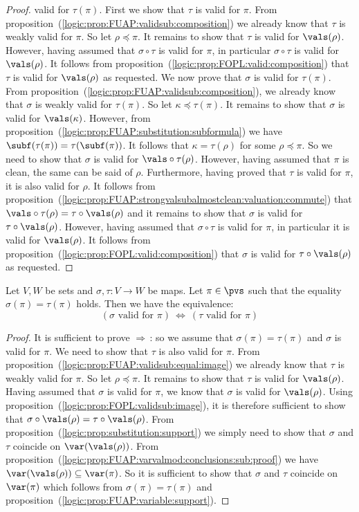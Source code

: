 \begin{proof}
valid for $\tau(\pi)$. First we show that $\tau$ is valid for $\pi$.
From proposition~(\ref{logic:prop:FUAP:validsub:composition}) we
already know that $\tau$ is weakly valid for $\pi$. So let
$\rho\preceq\pi$. It remains to show that $\tau$ is valid for
$\vals(\rho)$. However, having assumed that $\sigma\circ\tau$ is
valid for $\pi$, in particular $\sigma\circ\tau$ is valid for
$\vals(\rho)$. It follows from
proposition~(\ref{logic:prop:FOPL:valid:composition}) that $\tau$ is
valid for $\vals(\rho)$ as requested. We now prove that $\sigma$ is
valid for $\tau(\pi)$. From
proposition~(\ref{logic:prop:FUAP:validsub:composition}), we already
know that $\sigma$ is weakly valid for $\tau(\pi)$. So let
$\kappa\preceq\tau(\pi)$. It remains to show that $\sigma$ is valid
for $\vals(\kappa)$. However, from
proposition~(\ref{logic:prop:FUAP:substitution:subformula}) we have
$\subf(\tau(\pi))=\tau(\subf(\pi))$. It follows that
$\kappa=\tau(\rho)$ for some $\rho\preceq\pi$. So we need to show
that $\sigma$ is valid for $\vals\circ\tau(\rho)$. However, having
assumed that $\pi$ is clean, the same can be said of $\rho$.
Furthermore, having proved that $\tau$ is valid for $\pi$, it is
also valid for $\rho$. It follows from
proposition~(\ref{logic:prop:FUAP:strongvalsubalmostclean:valuation:commute})
that $\vals\circ\tau(\rho)=\tau\circ\vals(\rho)$ and it remains to
show that $\sigma$ is valid for $\tau\circ\vals(\rho)$. However,
having assumed that $\sigma\circ\tau$ is valid for $\pi$, in
particular it is valid for $\vals(\rho)$. It follows from
proposition~(\ref{logic:prop:FOPL:valid:composition}) that $\sigma$
is valid for $\tau\circ\vals(\rho)$ as requested.
\end{proof}

\begin{prop}\label{logic:prop:FUAP:strongvalidsub:equal:image}
Let $V,W$ be sets and $\sigma,\tau:V\to W$ be maps. Let $\pi\in\pvs$
such that the equality $\sigma(\pi)=\tau(\pi)$ holds. Then we have
the equivalence:
    \[
    (\mbox{$\sigma$ valid for $\pi$})\ \Leftrightarrow\
    (\mbox{$\tau$ valid for $\pi$})
    \]
\end{prop}
\begin{proof}
It is sufficient to prove $\Rightarrow$\,: so we assume that
$\sigma(\pi)=\tau(\pi)$ and $\sigma$ is valid for $\pi$. We need to
show that $\tau$ is also valid for $\pi$. From
proposition~(\ref{logic:prop:FUAP:validsub:equal:image}) we already
know that $\tau$ is weakly valid for $\pi$. So let $\rho\preceq\pi$.
It remains to show that $\tau$ is valid for $\vals(\rho)$. Having
assumed that $\sigma$ is valid for $\pi$, we know that $\sigma$ is
valid for $\vals(\rho)$. Using
proposition~(\ref{logic:prop:FOPL:validsub:image}), it is therefore
sufficient to show that
$\sigma\circ\vals(\rho)=\tau\circ\vals(\rho)$. From
proposition~(\ref{logic:prop:substitution:support}) we simply need
to show that $\sigma$ and $\tau$ coincide on $\var(\vals(\rho))$.
From
proposition~(\ref{logic:prop:FUAP:varvalmod:conclusions:sub:proof})
we have $\var(\vals(\rho))\subseteq\var(\pi)$. So it is sufficient
to show that $\sigma$ and $\tau$ coincide on $\var(\pi)$ which
follows from $\sigma(\pi)=\tau(\pi)$ and
proposition~(\ref{logic:prop:FUAP:variable:support}).
\end{proof}
